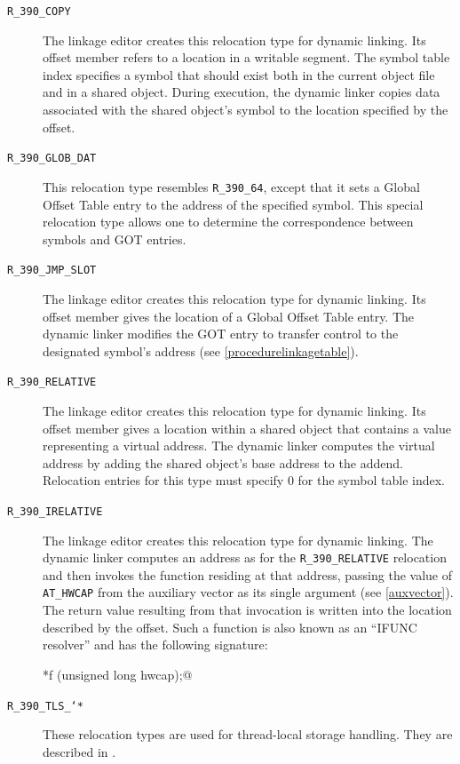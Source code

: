 \documentclass[USenglish,fontsize=11pt,twoside,%
  toc=bib,toc=idx,toc=graduated,numbers=noendperiod,
  bookmarks=true,
  bookmarksnumbered=true,
  bookmarksopen=true,
  bookmarksopenlevel=1,
  breaklinks=true,
  colorlinks=true,
  linkcolor=black,
  pdfpagelayout={TwoPageRight},
  pdfusetitle=true
]{scrreprt}
\newcommand{\NBITS}{64}
\newcommand{\NBITS}{32}
\begin{document}
\begin{description}
\item[\texttt{R\_390\_COPY}] The linkage editor creates this relocation
  type for dynamic linking.  Its offset member refers to a location in a
  writable segment.  The symbol table index specifies a symbol that should
  exist both in the current object file and in a shared object.  During
  execution, the dynamic linker copies data associated with the shared
  object's symbol to the location specified by the offset.
\item[\texttt{R\_390\_GLOB\_DAT}] This relocation type resembles
  \texttt{R\_390\_\NBITS{}}, except that it sets a Global Offset Table
  entry to the address of the specified symbol.  This special relocation
  type allows one to determine the correspondence between symbols and GOT
  entries.
\item[\texttt{R\_390\_JMP\_SLOT}] The linkage editor creates this
  relocation type for dynamic linking.  Its offset member gives the
  location of a Global Offset Table entry.  The dynamic linker modifies
  the GOT entry to transfer control to the designated symbol's address
  (see \cref{procedurelinkagetable}).
\item[\texttt{R\_390\_RELATIVE}] The linkage editor creates this
  relocation type for dynamic linking.  Its offset member gives a location
  within a shared object that contains a value representing a virtual
  address.  The dynamic linker computes the virtual address by adding the
  shared object's base address to the addend.  Relocation entries for this
  type must specify 0 for the symbol table index.
\item[\texttt{R\_390\_IRELATIVE}] The linkage editor creates this
  relocation type for dynamic linking.  The dynamic linker computes an
  address as for the \texttt{R\_390\_RELATIVE} relocation and then invokes
  the function residing at that address, passing the value of
  \texttt{AT\_HWCAP} from the auxiliary vector as its single argument (see
  \cref{auxvector}).  The return value resulting from that invocation is
  written into the location described by the offset.  Such a function is
  also known as an ``IFUNC resolver'' and has the following signature:
  \begin{center}
    \lstinline@void *f (unsigned long hwcap);@
  \end{center}
\item[\texttt{R\_390\_TLS\_\char`*}] These relocation types are used for
  thread-local storage handling.  They are described in
  \cite{tlshandling}.
\end{description}
\end{document}
